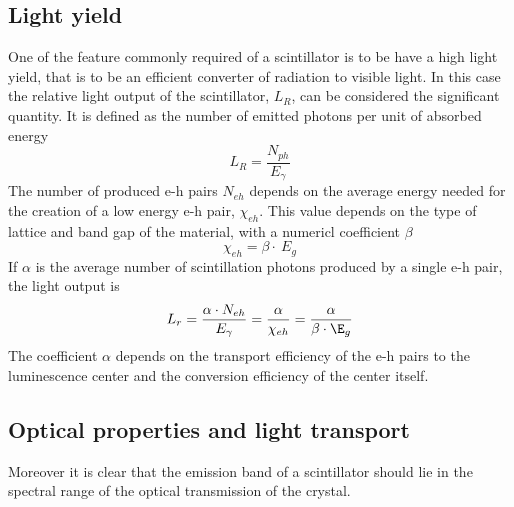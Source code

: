 \subsection{Light yield}
One of the feature commonly required of a scintillator is to be have a high light yield, that is to be an efficient converter of radiation to visible light.
In this case the relative light output of the scintillator, $L_{R}$, can be considered the significant quantity. It is defined as the number of emitted photons per unit of absorbed energy\cite{Rodnyi1997}
\begin{equation}
L_{R} = \frac{N_{ph}}{E_{\gamma}}
\end{equation}
The number of produced e-h pairs $N_{eh}$ depends on the average energy needed for the creation of a low energy e-h pair, $\chi _{eh}$. This value depends on the type of lattice and band gap of the material, with a numericl coefficient $\beta$
\begin{equation}
\chi _{eh} = \beta \cdot \ E_{g}
\end{equation}
If $\alpha$ is the average number of scintillation photons produced by a single e-h pair, the light output is
\begin{equation}
L_{r} = \frac{\alpha \cdot N_{eh}}{E_{\gamma}} = \frac{\alpha}{\chi _{eh}} = \frac{\alpha}{\beta \cdot \E_{g}}
\end{equation}
The coefficient $\alpha$ depends on the transport efficiency of the e-h pairs to the luminescence center and the conversion efficiency of the center itself.

\subsection{Optical properties and light transport}
Moreover it is clear that the emission band of a scintillator should lie in the spectral range of the optical transmission of the crystal.

